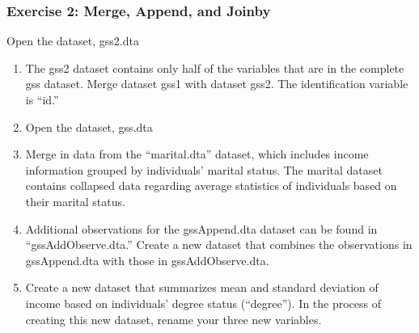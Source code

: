 \documentclass[table]{beamer}
\begin{document}
\begin{frame}
\frametitle{Exercise 2: Merge, Append, and Joinby}
\label{sec-7-5}

Open the dataset, gss2.dta

\begin{enumerate}
\item The gss2 dataset contains only half of the variables that are in the complete gss dataset. Merge dataset gss1 with dataset gss2.  The identification variable is ``id.''
\item Open the dataset, gss.dta
\item Merge in data from the ``marital.dta'' dataset, which includes income information grouped by individuals' marital status.  The marital dataset contains collapsed data regarding average statistics of individuals based on their marital status.
\item Additional observations for the gssAppend.dta dataset can be found in ``gssAddObserve.dta.''  Create a new dataset that combines the observations in gssAppend.dta with those in gssAddObserve.dta.
\item Create a new dataset that summarizes mean and standard deviation of income based on individuals' degree status (``degree'').  In the process of creating this new dataset, rename your three new variables.
\end{enumerate}
\end{frame}
\end{document}
